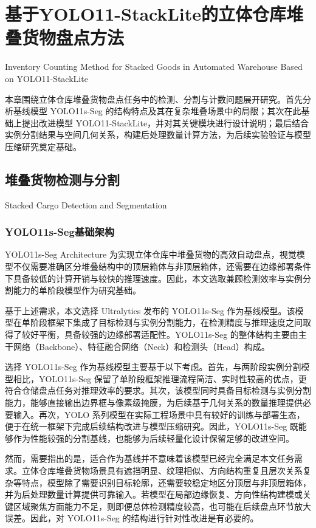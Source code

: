 \chapter{基于YOLO11-StackLite的立体仓库堆叠货物盘点方法}{Inventory Counting Method for Stacked Goods in Automated Warehouse Based on YOLO11-StackLite}

本章围绕立体仓库堆叠货物盘点任务中的检测、分割与计数问题展开研究。首先分析基线模型 YOLO11s-Seg 的结构特点及其在复杂堆叠场景中的局限；其次在此基础上提出改进模型 YOLO11-StackLite，并对其关键模块进行设计说明；最后结合实例分割结果与空间几何关系，构建后处理数量计算方法，为后续实验验证与模型压缩研究奠定基础。

\section{堆叠货物检测与分割}{Stacked Cargo Detection and Segmentation}

\subsection{YOLO11s-Seg基础架构}{YOLO11s-Seg Architecture}
为实现立体仓库中堆叠货物的高效自动盘点，视觉模型不仅需要准确区分堆叠结构中的顶层箱体与非顶层箱体，还需要在边缘部署条件下具备较低的计算开销与较快的推理速度。因此，本文选取兼顾检测效率与实例分割能力的单阶段模型作为研究基础。

基于上述需求，本文选择 Ultralytics 发布的 YOLO11s-Seg 作为基线模型\cite{ultralytics2025yolo11}。该模型在单阶段框架下集成了目标检测与实例分割能力，在检测精度与推理速度之间取得了较好平衡，具备较强的边缘部署适配性。YOLO11s-Seg 的整体结构主要由主干网络（Backbone）、特征融合网络（Neck）和检测头（Head）构成。

选择 YOLO11s-Seg 作为基线模型主要基于以下考虑。首先，与两阶段实例分割模型相比，YOLO11s-Seg 保留了单阶段框架推理流程简洁、实时性较高的优点，更符合仓储盘点任务对推理效率的要求。其次，该模型同时具备目标检测与实例分割能力，能够直接输出边界框与像素级掩膜，为后续基于几何关系的数量推理提供必要输入。再次，YOLO 系列模型在实际工程场景中具有较好的训练与部署生态，便于在统一框架下完成后续结构改进与模型压缩研究。因此，YOLO11s-Seg 既能够作为性能较强的分割基线，也能够为后续轻量化设计保留足够的改进空间。

然而，需要指出的是，适合作为基线并不意味着该模型已经完全满足本文任务需求。立体仓库堆叠货物场景具有遮挡明显、纹理相似、方向结构重复且层次关系复杂等特点，模型除了需要识别目标轮廓，还需要较稳定地区分顶层与非顶层箱体，并为后处理数量计算提供可靠输入。若模型在局部边缘恢复、方向性结构建模或关键区域聚焦方面能力不足，则即便总体检测精度较高，也可能在后续盘点环节放大误差。因此，对 YOLO11s-Seg 的结构进行针对性改进是有必要的。

